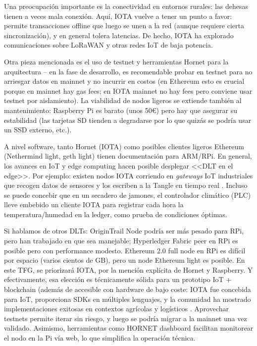 Una preocupación importante es la conectividad en entornos rurales: las dehesas tienen a veces mala conexión. Aquí, IOTA vuelve a tener un punto a favor: permite transacciones offline que luego se unen a la red (aunque requiere cierta sincronización), y en general tolera latencias. De hecho, IOTA ha explorado comunicaciones sobre LoRaWAN y otras redes IoT de baja potencia.

Otra pieza mencionada es el uso de testnet y herramientas Hornet para la arquitectura – en la fase de desarrollo, es recomendable probar en testnet para no arriesgar datos en mainnet y no incurrir en costos (en Ethereum esto es crucial porque en mainnet hay gas fees; en IOTA mainnet no hay fees pero conviene usar testnet por aislamiento). La viabilidad de nodos ligeros se extiende también al mantenimiento: Raspberry Pi es barato (unos 50€) pero hay que asegurar su estabilidad (las tarjetas SD tienden a degradarse por lo que quizás se podría usar un SSD externo, etc.).

A nivel software, tanto Hornet (IOTA) como posibles clientes ligeros Ethereum (Nethermind light, geth light) tienen documentación para ARM/RPi. En general, los avances en IoT y edge computing hacen posible desplegar <<DLT en el edge>>. Por ejemplo: existen nodos IOTA corriendo en \textit{gateways} IoT industriales que recogen datos de sensores y los escriben a la Tangle en tiempo real \cite{pullo_integrating_2024}. Incluso se puede concebir que en un secadero de jamones, el controlador climático (PLC) lleve embebido un cliente IOTA para registrar cada hora la temperatura/humedad en la ledger, como prueba de condiciones óptimas.

Si hablamos de otros DLTs: OriginTrail Node podría ser más pesado para RPi, pero han trabajado en que sea manejable; Hyperledger Fabric peer en RPi es posible pero con performance modesto. Ethereum 2.0 full node en RPi es difícil por espacio (varios cientos de GB), pero un node Ethereum light es posible. En este TFG, se priorizará IOTA, por la mención explícita de Hornet y Raspberry. Y efectivamente, esa elección es técnicamente sólida para un prototipo IoT + blockchain (además de accesible con hardware de bajo coste: IOTA fue concebida para IoT, proporciona SDKs en múltiples lenguajes, y la comunidad ha mostrado implementaciones exitosas en contextos agrícolas y logísticos \cite{pullo_integrating_2024}. Aprovechar testnets permite iterar sin riesgo, y luego se podría migrar a la mainnet una vez validado. Asimismo, herramientas como HORNET dashboard facilitan monitorear el nodo en la Pi vía web, lo que simplifica la operación técnica.

